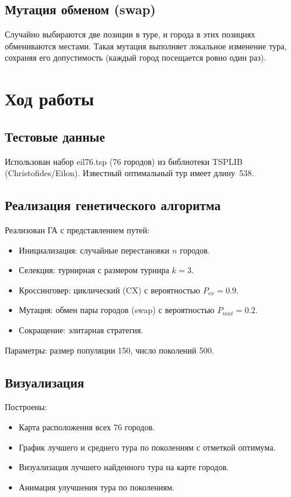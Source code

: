 \documentclass[14pt,a4paper]{extarticle}
\begin{document}
\subsection{Мутация обменом (swap)}

Случайно выбираются две позиции в туре, и города в этих позициях обмениваются местами. Такая мутация выполняет локальное изменение тура, сохраняя его допустимость (каждый город посещается ровно один раз).

\section{Ход работы}

\subsection{Тестовые данные}

Использован набор eil76.tsp (76 городов) из библиотеки TSPLIB (Christofides/Eilon). Известный оптимальный тур имеет длину~538.

\subsection{Реализация генетического алгоритма}

Реализован ГА с представлением путей:
\begin{itemize}
\item Инициализация: случайные перестановки $n$ городов.
\item Селекция: турнирная с размером турнира $k = 3$.
\item Кроссинговер: циклический (CX) с вероятностью $P_{cx} = 0.9$.
\item Мутация: обмен пары городов (swap) с вероятностью $P_{mut} = 0.2$.
\item Сокращение: элитарная стратегия.
\end{itemize}

Параметры: размер популяции 150, число поколений 500.

\subsection{Визуализация}

Построены:
\begin{itemize}
\item Карта расположения всех 76 городов.
\item График лучшего и среднего тура по поколениям с отметкой оптимума.
\item Визуализация лучшего найденного тура на карте городов.
\item Анимация улучшения тура по поколениям.
\end{itemize}
\end{document}
